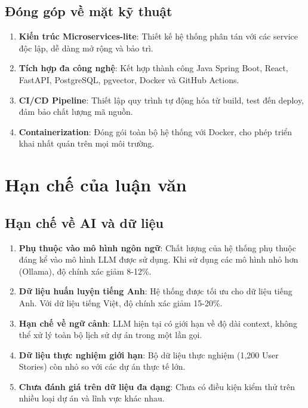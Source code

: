 \documentclass[12pt,a4paper]{report}
\begin{document}
\subsection{Đóng góp về mặt kỹ thuật}

\begin{enumerate}
\item \textbf{Kiến trúc Microservices-lite}:
Thiết kế hệ thống phân tán với các service độc lập, dễ dàng mở rộng và bảo trì.

\item \textbf{Tích hợp đa công nghệ}:
Kết hợp thành công Java Spring Boot, React, FastAPI, PostgreSQL, pgvector, Docker và GitHub Actions.

\item \textbf{CI/CD Pipeline}:
Thiết lập quy trình tự động hóa từ build, test đến deploy, đảm bảo chất lượng mã nguồn.

\item \textbf{Containerization}:
Đóng gói toàn bộ hệ thống với Docker, cho phép triển khai nhất quán trên mọi môi trường.
\end{enumerate}

\section{Hạn chế của luận văn}

\subsection{Hạn chế về AI và dữ liệu}

\begin{enumerate}
\item \textbf{Phụ thuộc vào mô hình ngôn ngữ}:
Chất lượng của hệ thống phụ thuộc đáng kể vào mô hình LLM được sử dụng. Khi sử dụng các mô hình nhỏ hơn (Ollama), độ chính xác giảm 8-12\%.

\item \textbf{Dữ liệu huấn luyện tiếng Anh}:
Hệ thống được tối ưu cho dữ liệu tiếng Anh. Với dữ liệu tiếng Việt, độ chính xác giảm 15-20\%.

\item \textbf{Hạn chế về ngữ cảnh}:
LLM hiện tại có giới hạn về độ dài context, không thể xử lý toàn bộ lịch sử dự án trong một lần gọi.

\item \textbf{Dữ liệu thực nghiệm giới hạn}:
Bộ dữ liệu thực nghiệm (1,200 User Stories) còn nhỏ so với các dự án thực tế lớn.

\item \textbf{Chưa đánh giá trên dữ liệu đa dạng}:
Chưa có điều kiện kiểm thử trên nhiều loại dự án và lĩnh vực khác nhau.
\end{enumerate}
\end{document}
